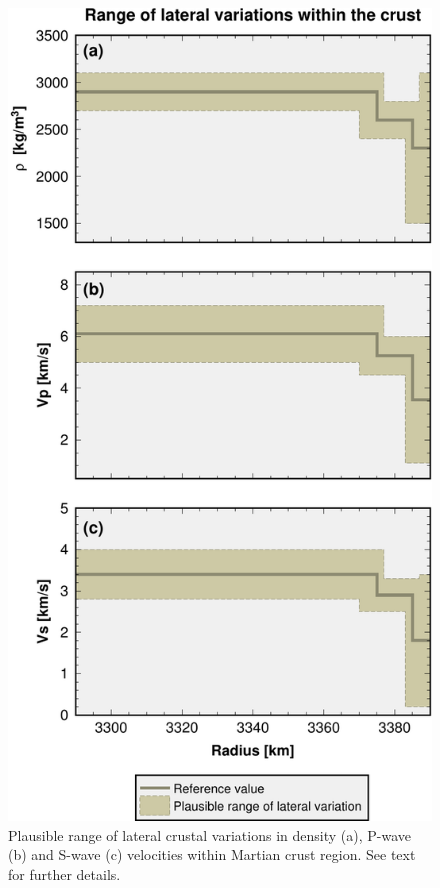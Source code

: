 \begin{figure}[h!]
\begin{center}
\includegraphics[scale=0.5]
{figures/Lateral_het_crust.pdf}
\caption{Plausible range of lateral crustal variations in density (a), P-wave (b) and S-wave (c) velocities within Martian crust region. See text for further details.}
\label{fig:lateral_lithosphere_anomalies}  
\end{center}
\end{figure}

